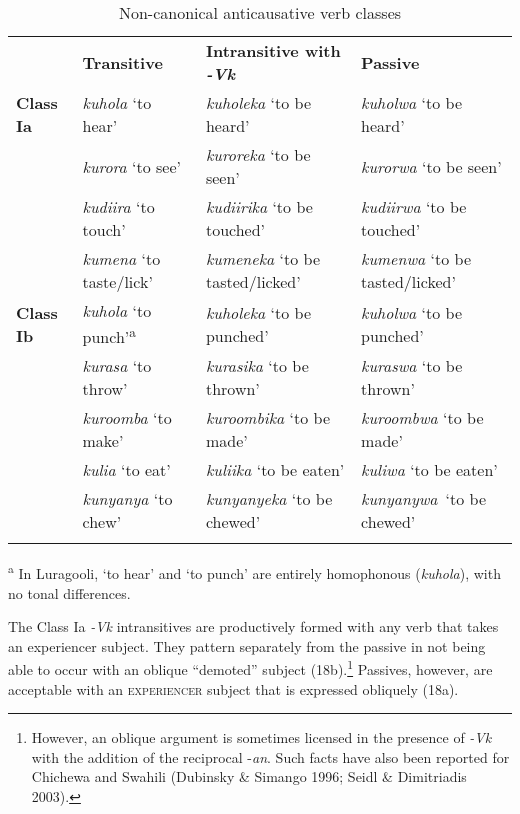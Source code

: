 \documentclass[output=paper]{langsci/langscibook}
\begin{document}
\begin{table}
\caption{Non-canonical anticausative verb classes}
\label{tab:4}

\begin{tabularx}{\textwidth}{XXXX} & \textbf{Transitive} & \textbf{Intransitive with }\textbf{\textit{-Vk}} & \textbf{Passive}\\
\lsptoprule
\textbf{Class Ia} & \textit{kuhola} ‘to hear’ & \textit{kuholeka }‘to be heard’ & \textit{kuholwa} ‘to be heard’\\
& \textit{kurora} ‘to see’ & \textit{kuroreka} ‘to be seen’ & \textit{kurorwa} ‘to be seen’\\
\hhline{~---} & \textit{kudiira} ‘to touch’ & \textit{kudiirika} ‘to be touched’ & \textit{kudiirwa} ‘to be touched’\\
\hhline{~---} & \textit{kumena} ‘to taste/lick’ & \textit{kumeneka} ‘to be tasted/licked’ & \textit{kumenwa} ‘to be tasted/licked’\\
\textbf{Class Ib} & \textit{kuhola} ‘to punch’\textsuperscript{a} & \textit{kuholeka} ‘to be punched’ & \textit{kuholwa} ‘to be punched’\\
& \textit{kurasa} ‘to throw’ & \textit{kurasika} ‘to be thrown’ & \textit{kuraswa} ‘to be thrown’\\
\hhline{~---} & \textit{kuroomba} ‘to make’ & \textit{kuroombika} ‘to be made’ & \textit{kuroombwa} ‘to be made’\\
\hhline{~---} & \textit{kulia} ‘to eat’ & \textit{kuliika} ‘to be eaten’ & \textit{kuliwa} ‘to be eaten’\\
\hhline{~---} & \textit{kunyanya} ‘to chew’ & \textit{kunyanyeka} ‘to be chewed’ & \textit{kunyanywa}~‘to be chewed’\\
\hhline{~---}
\lspbottomrule
\end{tabularx}
\textsuperscript{a }In Luragooli, ‘to hear’ and ‘to punch’\textit{ }are entirely homophonous (\textit{kuhola}), with no tonal differences.

\end{table}

The Class Ia \textit{-Vk }intransitives are productively formed with any verb that takes an experiencer subject. They pattern separately from the passive in not being able to occur with an oblique “demoted” subject (18b).\footnote{ However, an oblique argument is sometimes licensed in the presence of \textit{-Vk} with the addition of the reciprocal -\textit{an}. Such facts have also been reported for Chichewa and Swahili (Dubinsky \& Simango 1996; Seidl \& Dimitriadis 2003).} Passives, however, are acceptable with an \textsc{experiencer} subject that is expressed obliquely (18a).
\end{document}
